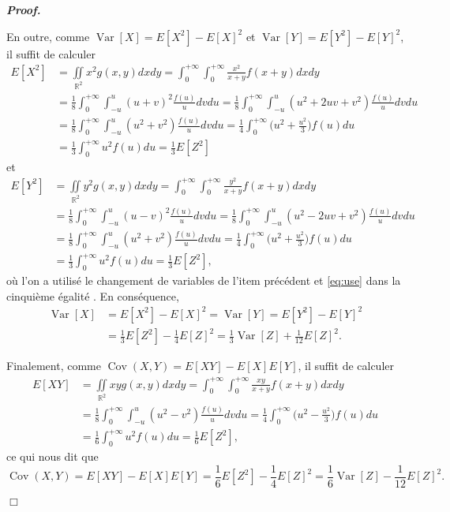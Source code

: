 \documentclass[11pt,a4paper]{article}
\newcommand{\RR}{\mathbb{R}}
\newenvironment{preuve}[1][]
{\vskip 2mm  \noindent\emph{\bf Proof#1. }}{$\Box$ \vskip 2mm}
\begin{document}
\begin{preuve}
\begin{enumerate}
				En outre, comme $\operatorname{Var}[X] = E[X^{2}] - E[X]^{2}$ et $\operatorname{Var}[Y] = E[Y^{2}] - E[Y]^{2}$, il suffit de calculer 
				\begin{align*} 
				E[X^{2}] &= \underset{\RR^{2}}{\iint} x^{2} g(x,y) dx dy = \int_{0}^{+ \infty} \int_{0}^{+ \infty} \frac{x^{2}}{x+y}f(x+y) dx dy
				\\
				&= \frac{1}{8} \int_{0}^{+ \infty} \int_{-u}^{u} (u+v)^{2} \frac{f(u)}{u} dv du = \frac{1}{8} \int_{0}^{+ \infty} \int_{-u}^{u} (u^{2}+2uv+v^{2}) \frac{f(u)}{u} dv du 
				\\
				&= \frac{1}{8} \int_{0}^{+ \infty} \int_{-u}^{u} (u^{2} + v^{2}) \frac{f(u)}{u} dv du = 
				\frac{1}{4} \int_{0}^{+ \infty}  \bigg(u^{2}+\frac{u^{2}}{3}\bigg) f(u) du 
				\\
				&= \frac{1}{3} \int_{0}^{+ \infty}  u^{2} f(u) du = \frac{1}{3} E[Z^{2}] 
				\end{align*}
				et
				\begin{align*} 
				E[Y^{2}] &= \underset{\RR^{2}}{\iint} y^{2} g(x,y) dx dy = \int_{0}^{+ \infty} \int_{0}^{+ \infty} \frac{y^{2}}{x+y}f(x+y) dx dy
				\\
				&= \frac{1}{8} \int_{0}^{+ \infty} \int_{-u}^{u} (u-v)^{2} \frac{f(u)}{u} dv du = \frac{1}{8} \int_{0}^{+ \infty} \int_{-u}^{u} (u^{2}-2uv+v^{2}) \frac{f(u)}{u} dv du 
				\\
				&= \frac{1}{8} \int_{0}^{+ \infty} \int_{-u}^{u} (u^{2} + v^{2}) \frac{f(u)}{u} dv du = 
				\frac{1}{4} \int_{0}^{+ \infty}  \bigg(u^{2}+\frac{u^{2}}{3}\bigg) f(u) du 
				\\
				&= \frac{1}{3} \int_{0}^{+ \infty}  u^{2} f(u) du = \frac{1}{3} E[Z^{2}],
				\end{align*}
				où l'on a utilisé le changement de variables de l'item précédent et \eqref{eq:use} dans la cinquième égalité .  
				En conséquence, 
				\begin{align*}
				\operatorname{Var}[X] &= E[X^{2}] - E[X]^{2} = \operatorname{Var}[Y] =  E[Y^{2}] - E[Y]^{2} 
				\\
				&= \frac{1}{3} E[Z^{2}] - \frac{1}{4} E[Z]^{2} = \frac{1}{3} \operatorname{Var}[Z] +\frac{1}{12} E[Z]^{2}. 
				\end{align*}
				
				Finalement, comme $\operatorname{Cov}(X,Y) = E[X Y] - E[X] E[Y]$, il suffit de calculer 
				\begin{align*} 
				E[X Y] &= \underset{\RR^{2}}{\iint} x y g(x,y) dx dy = \int_{0}^{+ \infty} \int_{0}^{+ \infty} \frac{x y}{x+y}f(x+y) dx dy
				\\
				&= \frac{1}{8} \int_{0}^{+ \infty} \int_{-u}^{u} (u^{2}-v^{2}) \frac{f(u)}{u} dv du 
				= \frac{1}{4} \int_{0}^{+ \infty}  \bigg(u^{2}-\frac{u^{2}}{3}\bigg) f(u) du 
				\\
				&= \frac{1}{6} \int_{0}^{+ \infty}  u^{2} f(u) du = \frac{1}{6} E[Z^{2}], 
				\end{align*}
				ce qui nous dit que 
				\[     \operatorname{Cov}(X,Y) = E[X Y] - E[X] E[Y] = \frac{1}{6} E[Z^{2}] - \frac{1}{4} E[Z]^{2} = \frac{1}{6} \operatorname{Var}[Z] - \frac{1}{12} E[Z]^{2}.     \]
			\end{enumerate}
		\end{preuve}
		
\end{document}
